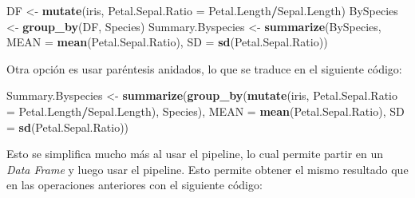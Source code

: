 \documentclass[]{book}
\newenvironment{Shaded}{\begin{snugshade}}{\end{snugshade}}
\newcommand{\DataTypeTok}[1]{\textcolor[rgb]{0.13,0.29,0.53}{#1}}
\newcommand{\KeywordTok}[1]{\textcolor[rgb]{0.13,0.29,0.53}{\textbf{#1}}}
\newcommand{\NormalTok}[1]{#1}
\newcommand{\OperatorTok}[1]{\textcolor[rgb]{0.81,0.36,0.00}{\textbf{#1}}}
\newcommand{\StringTok}[1]{\textcolor[rgb]{0.31,0.60,0.02}{#1}}
\begin{document}
\begin{Shaded}
\begin{Highlighting}[]
\NormalTok{DF <-}\StringTok{ }\KeywordTok{mutate}\NormalTok{(iris, }\DataTypeTok{Petal.Sepal.Ratio =}\NormalTok{ Petal.Length}\OperatorTok{/}\NormalTok{Sepal.Length)}
\NormalTok{BySpecies <-}\StringTok{ }\KeywordTok{group_by}\NormalTok{(DF, Species)}
\NormalTok{Summary.Byspecies <-}\StringTok{ }\KeywordTok{summarize}\NormalTok{(BySpecies, }\DataTypeTok{MEAN =} \KeywordTok{mean}\NormalTok{(Petal.Sepal.Ratio), }
    \DataTypeTok{SD =} \KeywordTok{sd}\NormalTok{(Petal.Sepal.Ratio))}
\end{Highlighting}
\end{Shaded}

Otra opción es usar paréntesis anidados, lo que se traduce en el
siguiente código:

\begin{Shaded}
\begin{Highlighting}[]
\NormalTok{Summary.Byspecies <-}\StringTok{ }\KeywordTok{summarize}\NormalTok{(}\KeywordTok{group_by}\NormalTok{(}\KeywordTok{mutate}\NormalTok{(iris, }\DataTypeTok{Petal.Sepal.Ratio =}\NormalTok{ Petal.Length}\OperatorTok{/}\NormalTok{Sepal.Length), }
\NormalTok{    Species), }\DataTypeTok{MEAN =} \KeywordTok{mean}\NormalTok{(Petal.Sepal.Ratio), }\DataTypeTok{SD =} \KeywordTok{sd}\NormalTok{(Petal.Sepal.Ratio))}
\end{Highlighting}
\end{Shaded}

Esto se simplifica mucho más al usar el pipeline, lo cual permite partir
en un \emph{Data Frame} y luego usar el pipeline. Esto permite obtener
el mismo resultado que en las operaciones anteriores con el siguiente
código:

\begin{Shaded}
\end{Shaded}
\end{document}

